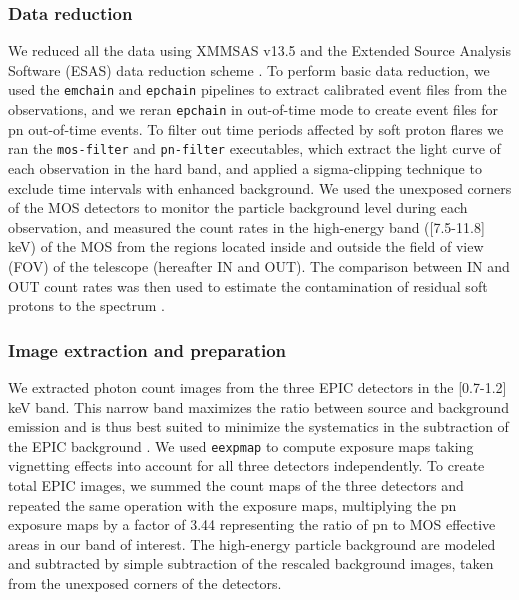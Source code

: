 \documentclass[traditabstract   ]{aa} %
\begin{document}
\subsubsection{Data reduction}
We  reduced all the data using XMMSAS v13.5 and the Extended Source Analysis Software (ESAS) data reduction scheme \citep{snowden08}. To perform basic data reduction, we used the \texttt{emchain} and \texttt{epchain} pipelines to extract calibrated event files from the observations, and we reran \texttt{epchain} in out-of-time mode to create event files for pn out-of-time events. To filter out time periods affected by soft proton flares we ran the \texttt{mos-filter} and \texttt{pn-filter} executables, which extract the light curve of each observation in the hard band, and applied a sigma-clipping technique to exclude time intervals with enhanced background. We used the unexposed corners of the MOS detectors to monitor the particle background level during each observation, and measured the count rates in the high-energy band ([7.5-11.8] keV) of the MOS from the regions located inside and outside the field of view (FOV) of the telescope (hereafter IN and OUT). The comparison between IN and OUT count rates was then used to estimate the contamination of residual soft protons to the spectrum \citep{deluca04,lm08,salvetti17}.

\subsubsection{Image extraction and preparation}
\label{sec:red_ima}

We extracted photon count images from the three EPIC detectors in the [0.7-1.2] keV band. This narrow band maximizes the ratio between source and background emission and is thus best suited to minimize the systematics in the subtraction of the EPIC background \citep{ettori+10}. We used \texttt{eexpmap} to compute exposure maps taking vignetting effects into account for all three detectors independently. To create total EPIC images, we summed the count maps of the three detectors and repeated the same operation with the exposure maps, multiplying the pn exposure maps by a factor of 3.44 representing the ratio of pn to MOS effective areas in our band of interest.  
{
The high-energy particle background are modeled and subtracted by simple subtraction of the rescaled background images, taken from the unexposed corners of the detectors.
}
\end{document}
